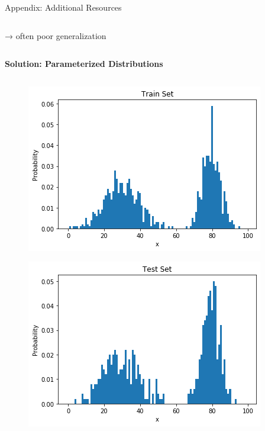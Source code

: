 \begin{frame}[allowframebreaks]{Appendix: Additional Resources}
\begin{columns}
\begin{column}{0.55\textwidth}
        → often poor generalization
    \end{column}
\end{columns}

\framebreak

\large
\textbf{Solution: Parameterized Distributions}
\normalsize
\begin{columns}
    \begin{column}{0.45\textwidth}
        \begin{figure}
            \centering
            \includegraphics[width=\textwidth,keepaspectratio]{images/autoregressive/histogram_training.png}
        \end{figure}
        \begin{figure}
            \centering
            \includegraphics[width=\textwidth,keepaspectratio]{images/autoregressive/histogram_test.png}

\end{figure}
\end{column}
\end{columns}
\end{frame}
